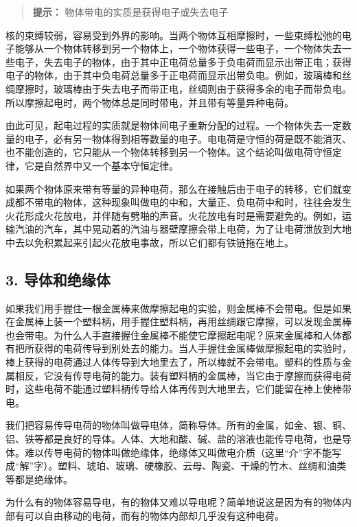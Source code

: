 \begin{quote}
\textbf{提示：} 物体带电的实质是获得电子或失去电子
\end{quote}

核的束缚较弱，容易受到外界的影响。当两个物体互相摩擦时，一些束缚松弛的电子能够从一个物体转移到另一个物体上，一个物体获得一些电子，一个物体失去一些电子，失去电子的物体，由于其中正电荷总量多于负电荷而显示出带正电；获得电子的物体，由于其中负电荷总量多于正电荷而显示出带负电。例如，玻璃棒和丝绸摩擦时，玻璃棒由于失去电子而带正电，丝绸则由于获得多余的电子而带负电。所以摩擦起电时，两个物体总是同时带电，并且带有等量异种电荷。

由此可见，起电过程的实质就是物体间电子重新分配的过程。一个物体失去一定数量的电子，必有另一物体得到相等数量的电子。电电荷是守恒的荷是既不能消灭、也不能创造的，它只能从一个物体转移到另一个物体。这个结论叫做电荷守恒定律，它是自然界中又一个基本守恒定律。

如果两个物体原来带有等量的异种电荷，那么在接触后由于电子的转移，它们就变成都不带电的物体，这种现象叫做电的中和，大量正、负电荷中和时，往往会发生火花形成火花放电，并伴随有劈啪的声音。火花放电有时是需要避免的。例如，运输汽油的汽车，其中晃动着的汽油与器壁摩擦会带上电荷，为了让电荷泄放到大地中去以免积累起来引起火花放电事故，所以它们都有铁链拖在地上。

\subsection{3. 导体和绝缘体}\label{ux5bfcux4f53ux548cux7eddux7f18ux4f53}

如果我们用手握住一根金属棒来做摩擦起电的实验，则金属棒不会带电。但是如果在金属棒上装一个塑料柄，用手握住塑料柄，再用丝绸跟它摩擦，可以发现金属棒也会带电。为什么人手直接握住金属棒不能使它摩擦起电呢？原来金属棒和人体都有把所获得的电荷传导到别处去的能力。当人手握住金属棒做摩擦起电的实验时，棒上获得的电荷通过人体传导到大地里去了，所以棒就不会带电。塑料的性质与金属相反，它没有传导电荷的能力。装有塑料柄的金属棒，当它由于摩擦而获得电荷时，这些电荷不能通过塑料柄传导给人体再传到大地里去，它们能留在棒上使棒带电。

我们把容易传导电荷的物体叫做导电体，简称导体。所有的金属，如金、银、铜、铝、铁等都是良好的导体。人体、大地和酸、碱、盐的溶液也能传导电荷，也是导体。难以传导电荷的物体叫做绝缘体，绝缘体又叫做电介质（这里``介''字不能写成``解''字）。塑料、琥珀、玻璃、硬橡胶、云母、陶瓷、干燥的竹木、丝绸和油类等都是绝缘体。

为什么有的物体容易导电，有的物体又难以导电呢？简单地说这是因为有的物体内部有可以自由移动的电荷，而有的物体内部却几乎没有这种电荷。

